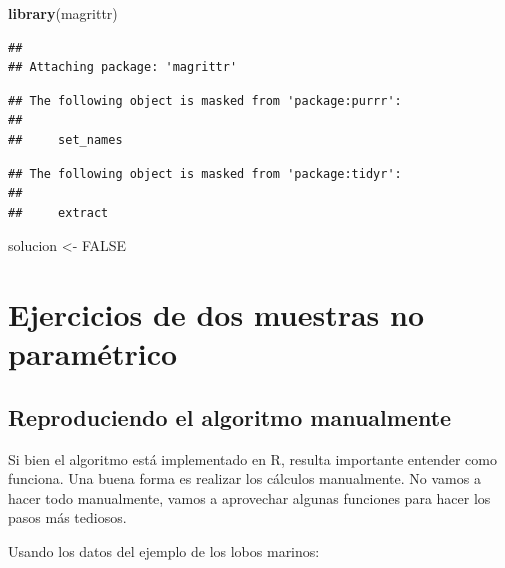 \documentclass[]{book}
\newenvironment{Shaded}{\begin{snugshade}}{\end{snugshade}}
\newcommand{\KeywordTok}[1]{\textcolor[rgb]{0.13,0.29,0.53}{\textbf{#1}}}
\newcommand{\NormalTok}[1]{#1}
\newcommand{\OtherTok}[1]{\textcolor[rgb]{0.56,0.35,0.01}{#1}}
\newcommand{\StringTok}[1]{\textcolor[rgb]{0.31,0.60,0.02}{#1}}
\theoremstyle{definition}
\theoremstyle{definition}
\theoremstyle{definition}
\theoremstyle{remark}
\begin{document}
\begin{Shaded}
\begin{Highlighting}[]
\KeywordTok{library}\NormalTok{(magrittr)}
\end{Highlighting}
\end{Shaded}

\begin{verbatim}
## 
## Attaching package: 'magrittr'
\end{verbatim}

\begin{verbatim}
## The following object is masked from 'package:purrr':
## 
##     set_names
\end{verbatim}

\begin{verbatim}
## The following object is masked from 'package:tidyr':
## 
##     extract
\end{verbatim}

\begin{Shaded}
\begin{Highlighting}[]
\NormalTok{solucion <-}\StringTok{ }\OtherTok{FALSE}
\end{Highlighting}
\end{Shaded}

\hypertarget{ejercicios-de-dos-muestras-no-parametrico}{%
\chapter{Ejercicios de dos muestras no
paramétrico}\label{ejercicios-de-dos-muestras-no-parametrico}}

\hypertarget{reproduciendo-el-algoritmo-manualmente}{%
\section{Reproduciendo el algoritmo
manualmente}\label{reproduciendo-el-algoritmo-manualmente}}

Si bien el algoritmo está implementado en R, resulta importante entender
como funciona. Una buena forma es realizar los cálculos manualmente. No
vamos a hacer todo manualmente, vamos a aprovechar algunas funciones
para hacer los pasos más tediosos.

Usando los datos del ejemplo de los lobos marinos:
\end{document}
